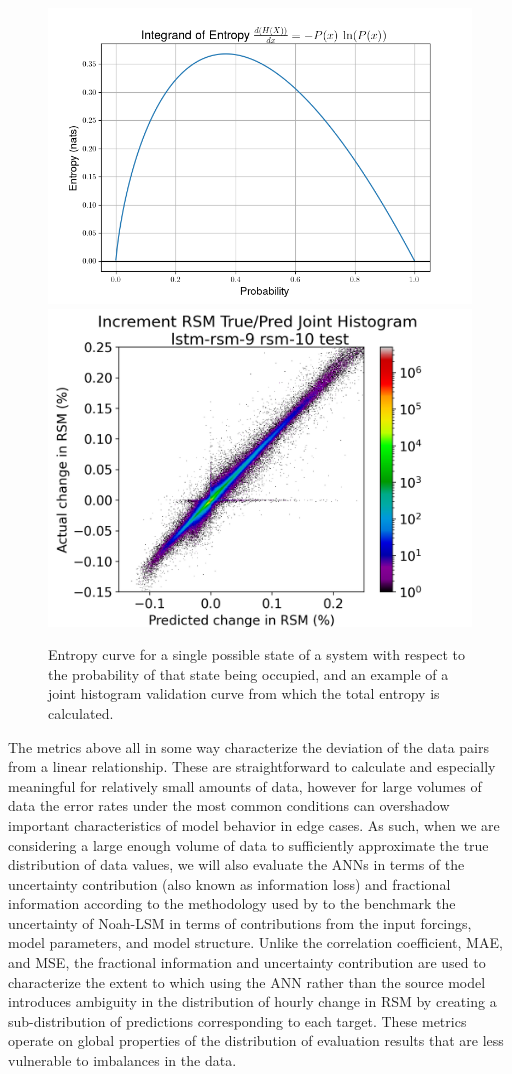 \begin{figure}[h!]
    \centering
    \includegraphics[width=.54\linewidth,draft=false]{figures/entropy.png}
    \includegraphics[width=.44\linewidth,draft=false]{figures/validation-curves/eval_test_lstm-rsm-9_rsm-10_hist-true-pred_na.png}

    \caption{Entropy curve for a single possible state of a system with respect to the probability of that state being occupied, and an example of a joint histogram validation curve from which the total entropy is calculated.}
    \label{entropy}
\end{figure}

The metrics above all in some way characterize the deviation of the data pairs from a linear relationship. These are straightforward to calculate and especially meaningful for relatively small amounts of data, however for large volumes of data the error rates under the most common conditions can overshadow important characteristics of model behavior in edge cases. As such, when we are considering a large enough volume of data to sufficiently approximate the true distribution of data values, we will also evaluate the ANNs in terms of the uncertainty contribution (also known as information loss) and fractional information according to the methodology used by \citep{nearing_benchmarking_2016} to the benchmark the uncertainty of Noah-LSM in terms of contributions from the input forcings, model parameters, and model structure. Unlike the correlation coefficient, MAE, and MSE, the fractional information and uncertainty contribution are used to characterize the extent to which using the ANN rather than the source model introduces ambiguity in the distribution of hourly change in RSM by creating a sub-distribution of predictions corresponding to each target. These metrics operate on global properties of the distribution of evaluation results that are less vulnerable to imbalances in the data.

